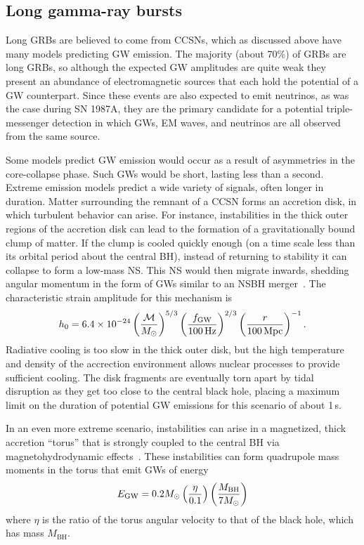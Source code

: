 \subsection{Long gamma-ray bursts}\label{sec:gw-grb-long}

Long GRBs are believed to come from \acp{CCSN}, which as discussed above have many models predicting GW emission.
The majority (about 70\%) of GRBs are long GRBs, so although the expected GW amplitudes are quite weak they present an abundance of electromagnetic sources that each hold the potential of a GW counterpart.
Since these events are also expected to emit neutrinos, as was the case during SN 1987A, they are the primary candidate for a potential triple-messenger detection in which GWs, EM waves, and neutrinos are all observed from the same source.

Some models predict GW emission would occur as a result of asymmetries in the core-collapse phase.
Such \acp{GW} would be short, lasting less than a second.
Extreme emission models predict a wide variety of signals, often longer in duration.
Matter surrounding the remnant of a \ac{CCSN} forms an accretion disk, in which turbulent behavior can arise.
For instance, instabilities in the thick outer regions of the accretion disk can lead to the formation of a gravitationally bound clump of matter.
If the clump is cooled quickly enough (on a time scale less than its orbital period about the central BH), instead of returning to stability it can collapse to form a low-mass NS.
This NS would then migrate inwards, shedding angular momentum in the form of GWs similar to an NSBH merger~\citep{Piro_2007}.
The characteristic strain amplitude for this mechanism is
\begin{equation}
	h_0 = 6.4 \times 10^{-24} \left( \frac{\mathcal{M}}{M_{\odot}} \right)^{5/3} \left( \frac{f_{\mathrm{GW}}}{100\,\mathrm{Hz}} \right)^{2/3} \left( \frac{r}{100\,\mathrm{Mpc}} \right)^{-1}.
\end{equation}
Radiative cooling is too slow in the thick outer disk, but the high temperature and density of the accrection environment allows nuclear processes to provide sufficient cooling.
The disk fragments are eventually torn apart by tidal disruption as they get too close to the central black hole, placing a maximum limit on the duration of potential GW emissions for this scenario of about 1\,s.

In an even more extreme scenario, instabilities can arise in a magnetized, thick accretion ``torus'' that is strongly coupled to the central BH via magnetohydrodynamic effects~\citep{vanPutten_2001, vanPutten_2004}.
These instabilities can form quadrupole mass moments in the torus that emit GWs of energy
\begin{equation}
	E_{\mathrm{GW}} = 0.2 M_{\odot} \left(\frac{\eta}{0.1}\right) \left(\frac{M_{\mathrm{BH}}}{7M_{\odot}} \right)
\end{equation}
where $\eta$ is the ratio of the torus angular velocity to that of the black hole, which has mass $M_{\mathrm{BH}}$.

